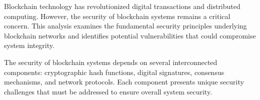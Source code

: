 Blockchain technology has revolutionized digital transactions and distributed computing. However, the security of blockchain systems remains a critical concern. This analysis examines the fundamental security principles underlying blockchain networks and identifies potential vulnerabilities that could compromise system integrity.

The security of blockchain systems depends on several interconnected components: cryptographic hash functions, digital signatures, consensus mechanisms, and network protocols. Each component presents unique security challenges that must be addressed to ensure overall system security.